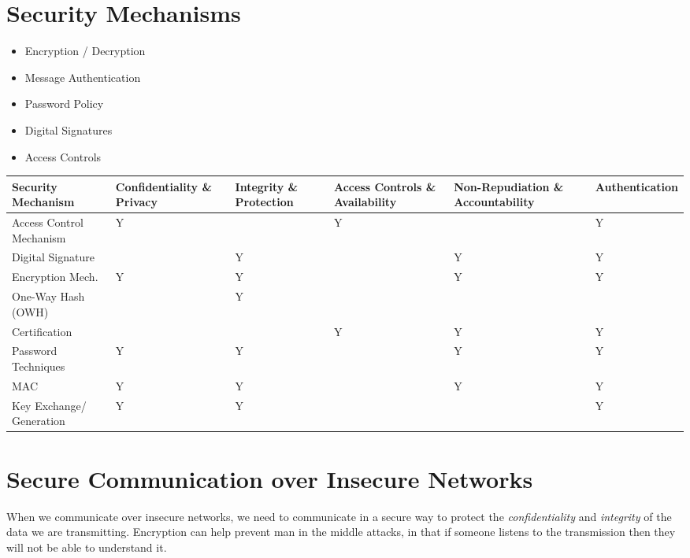 \section*{Security Mechanisms}
\begin{itemize}
    \item Encryption / Decryption
    \item Message Authentication
    \item Password Policy
    \item Digital Signatures
    \item Access Controls
\end{itemize}

\begin{table}[H]
    \centering
    \begin{tabular}{p{} C{0.12\textwidth} C{0.12\textwidth} C{0.12\textwidth} C{0.12\textwidth} C{0.12\textwidth}}
        \textbf{Security Mechanism} & \textbf{Confidentiality \& Privacy} & \textbf{Integrity \& Protection} & \textbf{Access Controls \& Availability} & \textbf{Non-Repudiation \& Accountability} & \textbf{Authentication}\\
        \hline
        \hline
        Access Control Mechanism & Y & & Y & & Y\\
        \hline        
        Digital Signature & & Y & & Y & Y\\
        \hline
        Encryption Mech. & Y & Y & & Y & Y\\
        \hline
        One-Way Hash (OWH) & & Y & & & \\
        \hline
        Certification & & & Y & Y & Y\\
        \hline
        Password Techniques & Y & Y & & Y & Y\\
        \hline
        MAC & Y & Y & & Y & Y\\
        \hline
        Key Exchange/ Generation & Y & Y & & & Y\\
        \hline
    \end{tabular}
\end{table}

\section*{Secure Communication over Insecure Networks}
When we communicate over insecure networks, we need to communicate in a secure way to protect the \textit{confidentiality} and \textit{integrity} of the data we are transmitting. Encryption can help prevent man in the middle attacks, in that if someone listens to the transmission then they will not be able to understand it. 
